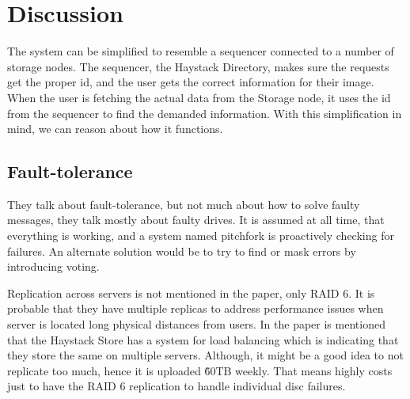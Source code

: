 \section{Discussion}
The system can be simplified to resemble a sequencer connected to a number of storage nodes.
The sequencer, the Haystack Directory, makes sure the requests get the
proper id, and the user gets the correct information for their image. When the user
is fetching the actual data from the Storage node, it uses the id from the sequencer
to find the demanded information. With this simplification in mind, we can reason about how it
functions.
\subsection{Fault-tolerance}
They talk about fault-tolerance, but not much about how to solve faulty messages, they talk
mostly about faulty drives. It is assumed at all time, that everything is working, and a system
named pitchfork is proactively checking for failures. An alternate solution would be to
try to find or mask errors by introducing voting.

Replication across servers is not mentioned in the paper, only RAID 6. It is probable that
they have multiple replicas to address performance issues when server is located
long physical distances from users. In the paper is mentioned that the Haystack Store
has a system for load balancing which is indicating that they store the same on multiple servers.
Although, it might be a good idea to not replicate too much, hence it is uploaded
\~60TB weekly. That means highly costs just to have the RAID 6 replication to handle
individual disc failures.
